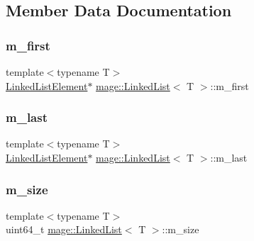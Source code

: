 \subsection{Member Data Documentation}
\hypertarget{classmage_1_1_linked_list_a194ecd23a82c83e2735717b32073340c}{}\label{classmage_1_1_linked_list_a194ecd23a82c83e2735717b32073340c} 
\subsubsection{\texorpdfstring{m\+\_\+first}{m\_first}}
{\footnotesize\ttfamily template$<$typename T$>$ \\
\hyperlink{structmage_1_1_linked_list_1_1_linked_list_element}{Linked\+List\+Element}$\ast$ \hyperlink{classmage_1_1_linked_list}{mage\+::\+Linked\+List}$<$ T $>$\+::m\+\_\+first\hspace{0.3cm}{\ttfamily [private]}}

\hypertarget{classmage_1_1_linked_list_acb461a96b93fa3917b7ed2e30fe67fce}{}\label{classmage_1_1_linked_list_acb461a96b93fa3917b7ed2e30fe67fce} 
\subsubsection{\texorpdfstring{m\+\_\+last}{m\_last}}
{\footnotesize\ttfamily template$<$typename T$>$ \\
\hyperlink{structmage_1_1_linked_list_1_1_linked_list_element}{Linked\+List\+Element}$\ast$ \hyperlink{classmage_1_1_linked_list}{mage\+::\+Linked\+List}$<$ T $>$\+::m\+\_\+last\hspace{0.3cm}{\ttfamily [private]}}

\hypertarget{classmage_1_1_linked_list_a1a1be1f46f0bc704e6387833b9528909}{}\label{classmage_1_1_linked_list_a1a1be1f46f0bc704e6387833b9528909} 
\subsubsection{\texorpdfstring{m\+\_\+size}{m\_size}}
{\footnotesize\ttfamily template$<$typename T$>$ \\
uint64\+\_\+t \hyperlink{classmage_1_1_linked_list}{mage\+::\+Linked\+List}$<$ T $>$\+::m\+\_\+size\hspace{0.3cm}{\ttfamily [private]}}

